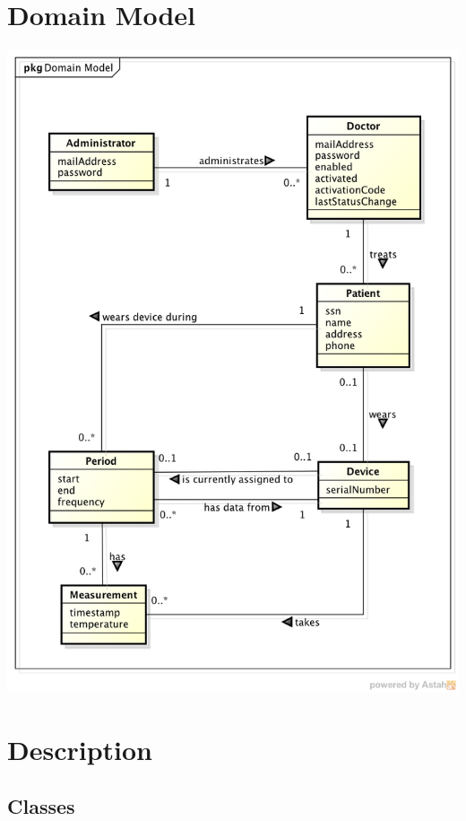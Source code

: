 \documentclass[fontsize=12pt,
               paper=a4,
               twoside=false,
               parskip=half,
               ]{scrartcl}
\begin{document}
\newcommand{\doctitle}{Domain Model}
\newcommand{\docrevision}{68}


\tableofcontents

\section{Domain Model}

\includegraphics[width=14cm]{./domain-model.png}

\section{Description}

\subsection{Classes}
\end{document}
